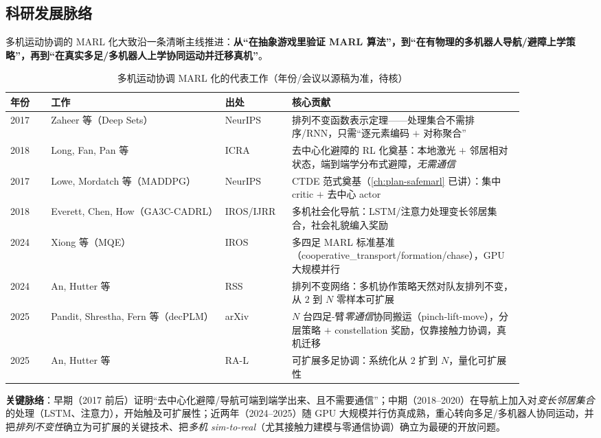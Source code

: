 \subsection*{科研发展脉络}
多机运动协调的 MARL 化大致沿一条清晰主线推进：\textbf{从“在抽象游戏里验证 MARL 算法”，到“在有物理的多机器人导航/避障上学策略”，再到“在真实多足/多机器人上学协同运动并迁移真机”}。

\begin{table}[H]\centering\small
\caption{多机运动协调 MARL 化的代表工作（年份/会议以源稿为准，待核）}
\label{tab:mc-history}
\begin{tabular}{p{0.07\linewidth}p{0.30\linewidth}p{0.10\linewidth}p{0.40\linewidth}}
\toprule
年份 & 工作 & 出处 & 核心贡献 \\
\midrule
2017 & Zaheer 等（Deep Sets） & NeurIPS & 排列不变函数表示定理——处理集合不需排序/RNN，只需“逐元素编码 $+$ 对称聚合” \\
2018 & Long, Fan, Pan 等 & ICRA & 去中心化避障的 RL 化奠基：本地激光 $+$ 邻居相对状态，端到端学分布式避障，\emph{无需通信} \\
2017 & Lowe, Mordatch 等（MADDPG） & NeurIPS & CTDE 范式奠基（\cref{ch:plan-safemarl} 已讲）：集中 critic $+$ 去中心 actor \\
2018 & Everett, Chen, How（GA3C-CADRL） & IROS/IJRR & 多机社会化导航：LSTM/注意力处理变长邻居集合，社会礼貌编入奖励 \\
2024 & Xiong 等（MQE） & IROS & 多四足 MARL 标准基准（cooperative\_transport/formation/chase），GPU 大规模并行 \\
2024 & An, Hutter 等 & RSS & 排列不变网络：多机协作策略天然对队友排列不变，从 $2$ 到 $N$ 零样本可扩展 \\
2025 & Pandit, Shrestha, Fern 等（decPLM） & arXiv & $N$ 台四足-臂\emph{零通信}协同搬运（pinch-lift-move），分层策略 $+$ constellation 奖励，仅靠接触力协调，真机迁移 \\
2025 & An, Hutter 等 & RA-L & 可扩展多足协调：系统化从 $2$ 扩到 $N$，量化可扩展性 \\
\bottomrule
\end{tabular}
\end{table}

\noindent\textbf{关键脉络}：早期（2017 前后）证明“去中心化避障/导航可端到端学出来、且不需要通信”；中期（2018--2020）在导航上加入对\emph{变长邻居集合}的处理（LSTM、注意力），开始触及可扩展性；近两年（2024--2025）随 GPU 大规模并行仿真成熟，重心转向多足/多机器人协同运动，并把\emph{排列不变性}确立为可扩展的关键技术、把\emph{多机 sim-to-real}（尤其接触力建模与零通信协调）确立为最硬的开放问题。


